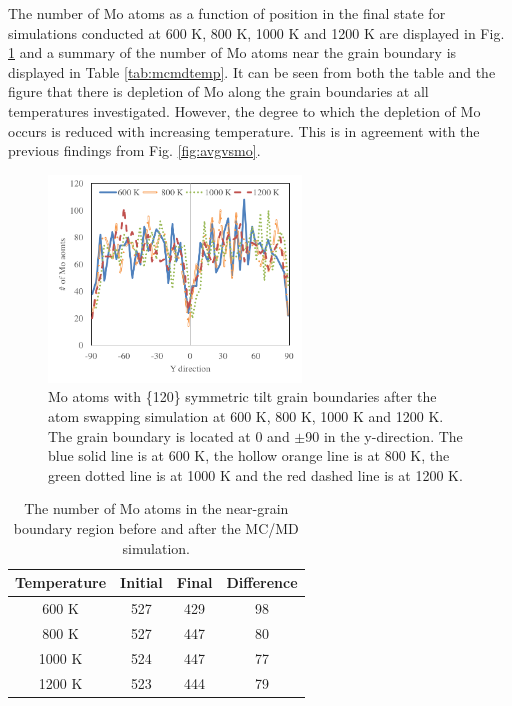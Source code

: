 \documentclass[review]{elsarticle}
\begin{document}
\FloatBarrier

The number of Mo atoms as a function of position in the final state for simulations conducted at 600 K, 800 K, 1000 K and 1200 K are displayed in Fig. \ref{fig:mcmdtemp} and a summary of the number of Mo atoms near the grain boundary is displayed in Table \ref{tab:mcmdtemp}. It can be seen from both the table and the figure that there is depletion of Mo along the grain boundaries at all temperatures investigated. However, the degree to which the depletion of Mo occurs is reduced with increasing temperature. This is in agreement with the previous findings from Fig. \ref{fig:avgvsmo}. 
 
\begin{figure}[h]
 \centering
 \includegraphics[width=0.6\textwidth]{mcmdtemp.png} 
 \caption{Mo atoms with \{120\} symmetric tilt grain boundaries after the atom swapping simulation at 600 K, 800 K, 1000 K and 1200 K. The grain boundary is located at 0 and $\pm$90 in the y-direction. The blue solid line is at 600 K, the hollow orange line is at 800 K, the green dotted line is at 1000 K and the red dashed line is at 1200 K.}
 \label{fig:mcmdtemp}
\end{figure}

\begin{table}[h]
\caption{The number of Mo atoms in the near-grain boundary region before and after the MC/MD simulation. } \label{tab:mcmdtemp}
\begin{center}
\begin{tabular}{|c|c|c|c|}
	\hline
Temperature & Initial & Final & Difference \\
\hline
600 K & 527 & 429 & 98 \\
800 K & 527 & 447 & 80\\ 
1000 K & 524 & 447 & 77 \\
1200 K & 523 & 444 & 79 \\
 	 \hline
\end{tabular}
\end{center}
\label{default}
\end{table}
\end{document}
